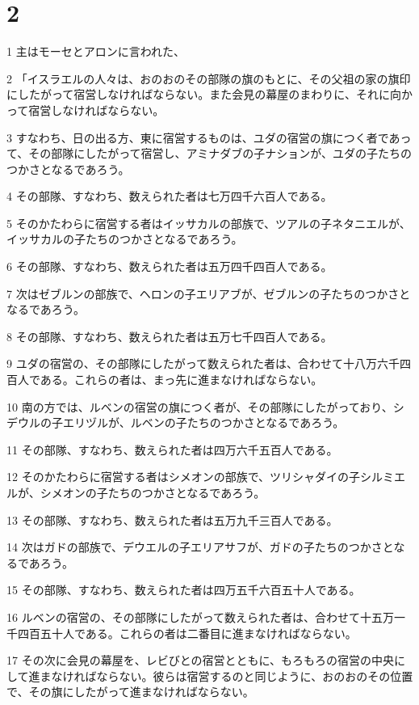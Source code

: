 \chapter{2}

\par 1 主はモーセとアロンに言われた、
\par 2 「イスラエルの人々は、おのおのその部隊の旗のもとに、その父祖の家の旗印にしたがって宿営しなければならない。また会見の幕屋のまわりに、それに向かって宿営しなければならない。
\par 3 すなわち、日の出る方、東に宿営するものは、ユダの宿営の旗につく者であって、その部隊にしたがって宿営し、アミナダブの子ナションが、ユダの子たちのつかさとなるであろう。
\par 4 その部隊、すなわち、数えられた者は七万四千六百人である。
\par 5 そのかたわらに宿営する者はイッサカルの部族で、ツアルの子ネタニエルが、イッサカルの子たちのつかさとなるであろう。
\par 6 その部隊、すなわち、数えられた者は五万四千四百人である。
\par 7 次はゼブルンの部族で、ヘロンの子エリアブが、ゼブルンの子たちのつかさとなるであろう。
\par 8 その部隊、すなわち、数えられた者は五万七千四百人である。
\par 9 ユダの宿営の、その部隊にしたがって数えられた者は、合わせて十八万六千四百人である。これらの者は、まっ先に進まなければならない。
\par 10 南の方では、ルベンの宿営の旗につく者が、その部隊にしたがっており、シデウルの子エリヅルが、ルベンの子たちのつかさとなるであろう。
\par 11 その部隊、すなわち、数えられた者は四万六千五百人である。
\par 12 そのかたわらに宿営する者はシメオンの部族で、ツリシャダイの子シルミエルが、シメオンの子たちのつかさとなるであろう。
\par 13 その部隊、すなわち、数えられた者は五万九千三百人である。
\par 14 次はガドの部族で、デウエルの子エリアサフが、ガドの子たちのつかさとなるであろう。
\par 15 その部隊、すなわち、数えられた者は四万五千六百五十人である。
\par 16 ルベンの宿営の、その部隊にしたがって数えられた者は、合わせて十五万一千四百五十人である。これらの者は二番目に進まなければならない。
\par 17 その次に会見の幕屋を、レビびとの宿営とともに、もろもろの宿営の中央にして進まなければならない。彼らは宿営するのと同じように、おのおのその位置で、その旗にしたがって進まなければならない。
